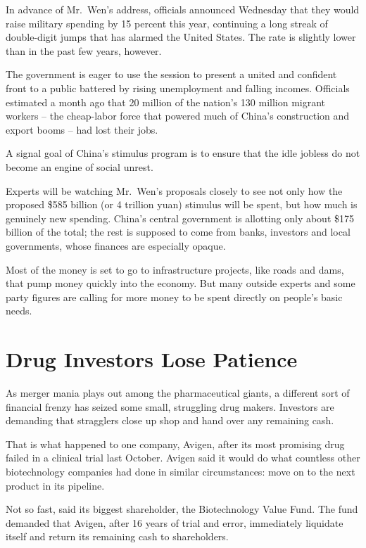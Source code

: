 \documentclass[12pt,a4paper,onecolumn]{article}
\begin{document}
\begin{CJK*}{GBK}{song}
In advance of Mr.~Wen's address, officials announced Wednesday that they would raise military
spending by 15 percent this year, continuing a long streak of double-digit jumps that has alarmed
the United States. The rate is slightly lower than in the past few years, however.

The government is eager to use the session to present a united and confident front to a public
battered by rising unemployment and falling incomes. Officials estimated a month ago that 20 million
of the nation's 130 million migrant workers -- the cheap-labor force that powered much of China's
construction and export booms -- had lost their jobs.

A signal goal of China's stimulus program is to ensure that the idle jobless do not become an engine
of social unrest.

Experts will be watching Mr.~Wen's proposals closely to see not only how the proposed \$585 billion
(or 4 trillion yuan) stimulus will be spent, but how much is genuinely new spending. China's central
government is allotting only about \$175 billion of the total; the rest is supposed to come from
banks, investors and local governments, whose finances are especially opaque.

Most of the money is set to go to infrastructure projects, like roads and dams, that pump money
quickly into the economy. But many outside experts and some party figures are calling for more money
to be spent directly on people's basic needs.

\section{Drug Investors Lose Patience}

As merger mania plays out among the pharmaceutical giants, a different sort of financial frenzy has
seized some small, struggling drug makers. Investors are demanding that stragglers close up shop and
hand over any remaining cash.

That is what happened to one company, Avigen, after its most promising drug failed in a clinical
trial last October. Avigen said it would do what countless other biotechnology companies had done in
similar circumstances: move on to the next product in its pipeline.

Not so fast, said its biggest shareholder, the Biotechnology Value Fund. The fund demanded that
Avigen, after 16 years of trial and error, immediately liquidate itself and return its remaining
cash to shareholders.


\end{CJK*}
\end{document}
